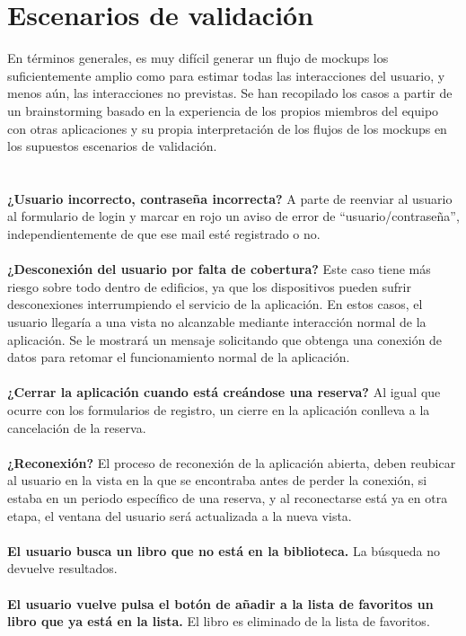 \documentclass[12pt]{article}
\begin{document}
\section{Escenarios de validación}
En términos generales, es muy difícil generar un flujo de mockups los suficientemente amplio como para estimar todas las interacciones del usuario, y menos aún, las interacciones no previstas. Se han recopilado los casos a partir de un brainstorming basado en la experiencia de los propios miembros del equipo con otras aplicaciones y su propia interpretación de los flujos de los mockups en los supuestos escenarios de validación.
\\
\\
\\
\textbf{¿Usuario incorrecto, contraseña incorrecta?}
A parte de reenviar al usuario al formulario de login y marcar en rojo un aviso de
error de “usuario/contraseña”, independientemente de que ese mail esté registrado o no.
\\
\\
\textbf{¿Desconexión del usuario por falta de cobertura?}
Este caso tiene más riesgo sobre todo dentro de edificios, ya que los dispositivos pueden sufrir desconexiones interrumpiendo el servicio de la aplicación. En estos casos, el usuario llegaría a una vista no alcanzable mediante interacción normal de la aplicación. 
Se le mostrará un mensaje solicitando que obtenga una conexión de datos para retomar el funcionamiento normal de la aplicación.
\\
\\
\textbf{¿Cerrar la aplicación cuando está creándose una reserva?}
Al igual que ocurre con los formularios de registro, un cierre en la aplicación conlleva a la cancelación de la reserva.
\\
\\
\textbf{¿Reconexión?}
El proceso de reconexión de la aplicación abierta, deben reubicar al usuario en la
vista en la que se encontraba antes de perder la conexión, si estaba en un periodo
específico de una reserva, y al reconectarse está ya en otra etapa, el ventana del usuario será actualizada a la nueva vista.
\\
\\
\textbf{El usuario busca un libro que no está en la biblioteca.}
La búsqueda no devuelve resultados.
\\
\\
\textbf{El usuario vuelve pulsa el botón de añadir a la lista de favoritos un libro que ya está en la lista.}
El libro es eliminado de la lista de favoritos.
\end{document}
